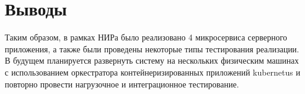 

\section{Выводы}
Таким образом, в рамках НИРа было реализовано 4 микросервиса серверного приложения, а также были проведены некоторые типы тестирования реализации. 
В будущем планируется развернуть систему на нескольких физическим машинах с использованием оркестратора контейнеризированных приложений 
kubernetus и повторно провести нагрузочное и интеграционное тестирование.




